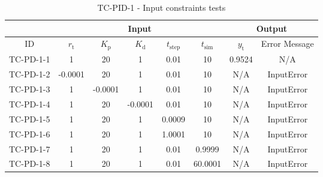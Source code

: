 \documentclass[12pt, titlepage]{article}
\begin{document}
\begin{table}[]
\begin{tabular}{lccccccc}
\hline
\multicolumn{1}{l|}{}   & \multicolumn{5}{c|}{Input}                            & \multicolumn{2}{c}{Output} \\ \hline
\multicolumn{1}{c|}{ID} & ${r_{\text{t}}}$ & ${K_{\text{p}}}$  & ${K_{\text{d}}}$ & ${t_{\text{step}}}$ & \multicolumn{1}{c|}{${t_{\text{sim}}}$} & ${y_{\text{t}}}$     & Error Message    \\ \hline
TC-PD-1-1 & 1       & 20      & 1       & 0.01   & 10      & 0.9524 & N/A        \\
TC-PD-1-2 & -0.0001 & 20      & 1       & 0.01   & 10      & N/A    & InputError \\
TC-PD-1-3 & 1       & -0.0001 & 1       & 0.01   & 10      & N/A    & InputError \\
TC-PD-1-4 & 1       & 20      & -0.0001 & 0.01   & 10      & N/A    & InputError \\
TC-PD-1-5 & 1       & 20      & 1       & 0.0009 & 10      & N/A    & InputError \\
TC-PD-1-6 & 1       & 20      & 1       & 1.0001 & 10      & N/A    & InputError \\
TC-PD-1-7 & 1       & 20      & 1       & 0.01   & 0.9999  & N/A    & InputError \\
TC-PD-1-8 & 1       & 20      & 1       & 0.01   & 60.0001 & N/A    & InputError
\end{tabular}
\caption{TC-PID-1 - Input constraints tests}
\label{tab:tc-pid-1}
\end{table}
\end{document}
